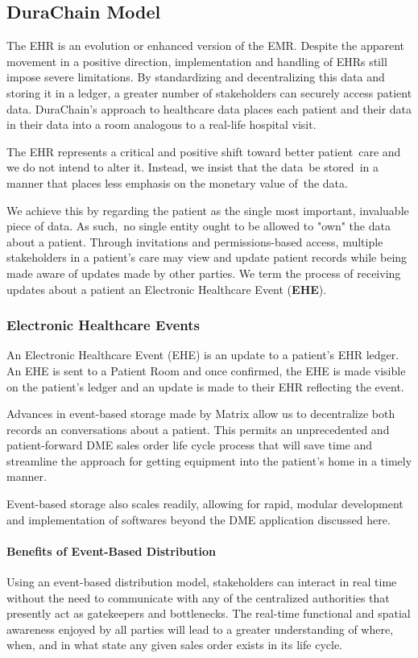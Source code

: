 \documentclass[letterpaper]{article}
\begin{document}
\subsection{DuraChain Model}
The EHR is an evolution or enhanced version of the EMR. Despite the apparent movement in a positive direction, implementation and handling of EHRs still impose severe limitations. By standardizing and decentralizing this data and storing it in a ledger, a greater number of stakeholders can securely access patient data. DuraChain's approach to healthcare data places each patient and their data in their data into a room analogous to a real-life hospital visit.%

The EHR represents a critical and positive shift toward better patient care and we do not intend to alter it. Instead, we insist that the data be stored in a manner that places less emphasis on the monetary value of the data.%

We achieve this by regarding the patient as the single most important, invaluable piece of data. As such, no single entity ought to be allowed to "own" the data about a patient. Through invitations and permissions-based access, multiple stakeholders in a patient's care may view and update patient records while being made aware of updates made by other parties. We term the process of receiving updates about a patient an Electronic Healthcare Event (\textbf{EHE}).%

  \subsubsection{Electronic Healthcare Events}
  An Electronic Healthcare Event (EHE) is an update to a patient’s EHR ledger. An EHE is sent to a Patient Room and once confirmed, the EHE is made visible on the patient’s ledger and an update is made to their EHR reflecting the event.%

  Advances in event-based storage made by Matrix allow us to decentralize both records an conversations about a patient. This permits an unprecedented and patient-forward DME sales order life cycle process that will save time and streamline the approach for getting equipment into the patient's home in a timely manner.%

  Event-based storage also scales readily, allowing for rapid, modular development and implementation of softwares beyond the DME application discussed here.%

    \paragraph{Benefits of Event-Based Distribution}
    Using an event-based distribution model, stakeholders can interact in real time without the need to communicate with any of the centralized authorities that presently act as gatekeepers and bottlenecks. The real-time functional and spatial awareness enjoyed by all parties will lead to a greater understanding of where, when, and in what state any given sales order exists in its life cycle.%
\end{document}
